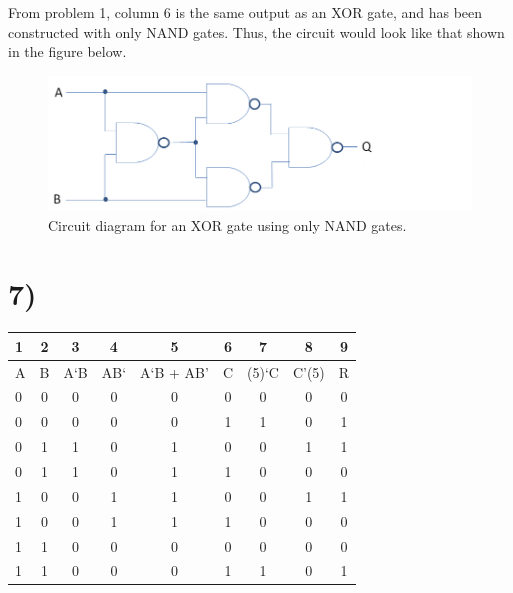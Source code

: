 \documentclass[a4paper,11pt]{article}
\begin{document}
From problem 1, column 6 is the same output as an XOR gate, and has been constructed with only NAND gates.  Thus, the circuit
would look like that shown in the figure below.

\begin{figure}[h]
\caption{Circuit diagram for an XOR gate using only NAND gates.}
\centering
\includegraphics[width=1\textwidth]{p6_circuit.png}
\end{figure}


\section*{7)}
\begin{tabular}{| l | c | c | c | c | c | c | c | c |}
  \hline	
    1 & 2 & 3 & 4 & 5 & 6 & 7 & 8 & 9  \\  \hline \hline
    A & B & A`B & AB` & A`B + AB' & C & (5)`C & C'(5) & R  \\  \hline \hline
    0 & 0 & 0 & 0 & 0 & 0 & 0 & 0 & 0  \\  \hline 
    0 & 0 & 0 & 0 & 0 & 1 & 1 & 0 & 1  \\  \hline 
    0 & 1 & 1 & 0 & 1 & 0 & 0 & 1 & 1  \\  \hline 
    0 & 1 & 1 & 0 & 1 & 1 & 0 & 0 & 0  \\  \hline 
    1 & 0 & 0 & 1 & 1 & 0 & 0 & 1 & 1  \\  \hline 
    1 & 0 & 0 & 1 & 1 & 1 & 0 & 0 & 0  \\  \hline 
    1 & 1 & 0 & 0 & 0 & 0 & 0 & 0 & 0  \\  \hline 
    1 & 1 & 0 & 0 & 0 & 1 & 1 & 0 & 1  \\  \hline 

\end{tabular} \\

\end{document}
